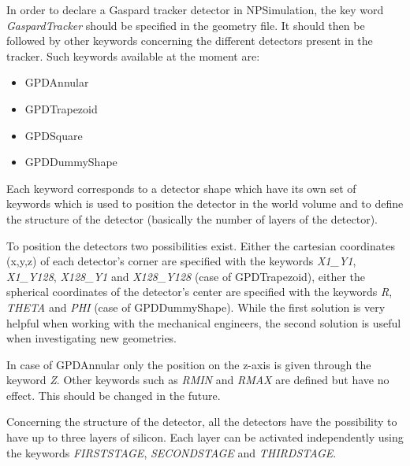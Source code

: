 \documentclass[a4paper,12pt]{article}
\begin{document}
In order to declare a Gaspard tracker detector in NPSimulation, the key
word {\it GaspardTracker} should be specified in the geometry file. It
should then be followed by other keywords concerning the different
detectors present in the tracker. Such keywords available at the moment
are:

\begin{itemize}
   \item {GPDAnnular}
   \item {GPDTrapezoid}
   \item {GPDSquare}
   \item {GPDDummyShape}
\end{itemize}

Each keyword corresponds to a detector shape which have its own set of
keywords which is used to position the detector in the world volume
and to define the structure of the detector (basically the number of 
layers of the detector).

To position the detectors two possibilities exist. Either the cartesian 
coordinates (x,y,z) of each detector's corner are specified with the 
keywords {\it X1\_Y1}, {\it X1\_Y128}, {\it X128\_Y1} and {\it X128\_Y128}
(case of GPDTrapezoid), either the spherical coordinates of the detector's 
center are specified with the keywords {\it R}, {\it THETA} and {\it PHI} 
(case of GPDDummyShape). While the first solution is very helpful when 
working with the mechanical engineers, the second solution is useful when 
investigating new geometries.

In case of GPDAnnular only the position on the z-axis is given through
the keyword {\it Z}. Other keywords such as {\it RMIN} and {\it RMAX} 
are defined but have no effect. This should be changed in the future.

Concerning the structure of the detector, all the detectors have the 
possibility to have up to three layers of silicon. Each layer can be 
activated independently using the keywords {\it FIRSTSTAGE}, 
{\it SECONDSTAGE} and {\it THIRDSTAGE}. 
\end{document}
